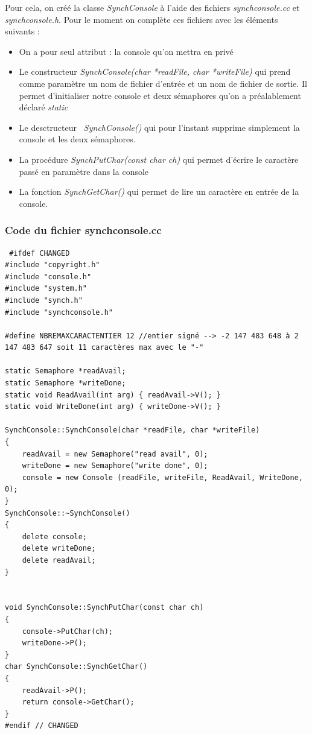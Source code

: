 \documentclass[a4paper,10pt]{report}
\begin{document}
  Pour cela, on créé la classe \emph{SynchConsole} à l'aide des fichiers \emph{synchconsole.cc} et \emph{synchconsole.h}. Pour le moment on complète ces fichiers
  avec les éléments suivants : 
  \begin{itemize}
   \item On a pour seul attribut : la console qu'on mettra en privé
   \item Le constructeur \emph{SynchConsole(char *readFile, char *writeFile)} qui prend comme paramètre un nom de fichier d'entrée et un nom de fichier de sortie.
   Il permet d'initialiser notre console et deux sémaphores qu'on a préalablement déclaré \emph{static}
   \item Le desctructeur \emph{~SynchConsole()} qui pour l'instant supprime simplement la console et les deux sémaphores.
   \item La procédure \emph{SynchPutChar(const char ch)} qui permet d'écrire le caractère passé en paramètre dans la console
   \item La fonction \emph{SynchGetChar()} qui permet de lire un caractère en entrée de la console.
  \end{itemize}
\textcolor{TealBlue}{\subsubsection*{Code du fichier synchconsole.cc}}
\begin{lstlisting}
 #ifdef CHANGED
#include "copyright.h"
#include "console.h"
#include "system.h"
#include "synch.h"
#include "synchconsole.h"

#define NBREMAXCARACTENTIER 12 //entier signé --> -2 147 483 648 à 2 147 483 647 soit 11 caractères max avec le "-"

static Semaphore *readAvail;
static Semaphore *writeDone;
static void ReadAvail(int arg) { readAvail->V(); }
static void WriteDone(int arg) { writeDone->V(); }

SynchConsole::SynchConsole(char *readFile, char *writeFile)
{
	readAvail = new Semaphore("read avail", 0);
	writeDone = new Semaphore("write done", 0);
	console = new Console (readFile, writeFile, ReadAvail, WriteDone, 0);
}
SynchConsole::~SynchConsole()
{
	delete console;
	delete writeDone;
	delete readAvail;
}


void SynchConsole::SynchPutChar(const char ch)
{
	console->PutChar(ch);
	writeDone->P();
}
char SynchConsole::SynchGetChar()
{
	readAvail->P();
	return console->GetChar();
}
#endif // CHANGED
\end{lstlisting}
\end{document}
